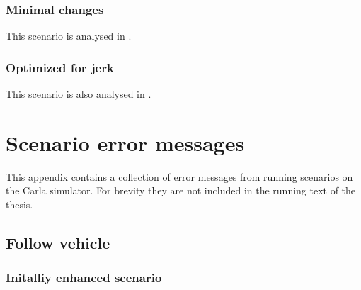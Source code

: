\subsection{Minimal changes}



This scenario is analysed in .

\subsection{Optimized for jerk}\label{sec:appendixJerkOptimizedAccident}


This scenario is also analysed in .

\chapter{Scenario error messages}\label{sec:errorMessages}

This appendix contains a collection of error messages from running scenarios on the Carla simulator.
For brevity they are not included in the running text of the thesis.

\section{Follow vehicle}

\subsection{Initalliy enhanced scenario }

